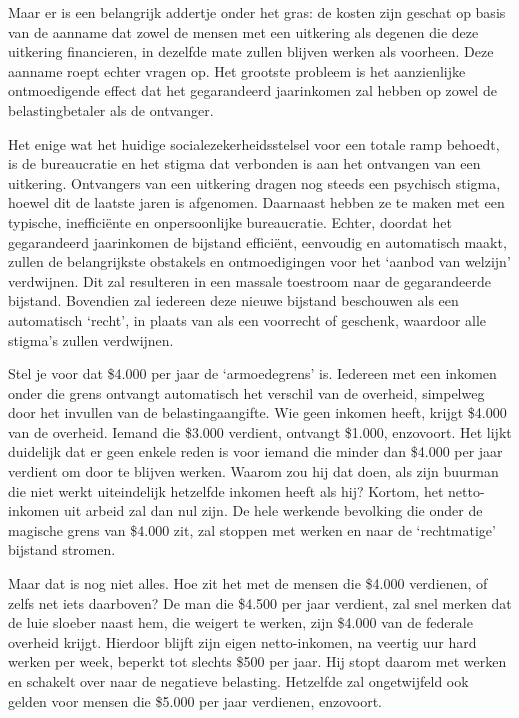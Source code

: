 \documentclass[
  a5paper,
  smalldemyvopaper,10pt,twoside,onecolumn,openright,extrafontsizes,hidelinks]{memoir}
\begin{document}
Maar er is een belangrijk addertje onder het gras: de kosten zijn
geschat op basis van de aanname dat zowel de mensen met een uitkering
als degenen die deze uitkering financieren, in dezelfde mate zullen
blijven werken als voorheen. Deze aanname roept echter vragen op. Het
grootste probleem is het aanzienlijke ontmoedigende effect dat het
gegarandeerd jaarinkomen zal hebben op zowel de belastingbetaler als de
ontvanger.

Het enige wat het huidige socialezekerheidsstelsel voor een totale ramp
behoedt, is de bureaucratie en het stigma dat verbonden is aan het
ontvangen van een uitkering. Ontvangers van een uitkering dragen nog
steeds een psychisch stigma, hoewel dit de laatste jaren is afgenomen.
Daarnaast hebben ze te maken met een typische, inefficiënte en
onpersoonlijke bureaucratie. Echter, doordat het gegarandeerd
jaarinkomen de bijstand efficiënt, eenvoudig en automatisch maakt,
zullen de belangrijkste obstakels en ontmoedigingen voor het `aanbod van
welzijn' verdwijnen. Dit zal resulteren in een massale toestroom naar de
gegarandeerde bijstand. Bovendien zal iedereen deze nieuwe bijstand
beschouwen als een automatisch `recht', in plaats van als een voorrecht
of geschenk, waardoor alle stigma's zullen verdwijnen.

Stel je voor dat \$4.000 per jaar de `armoedegrens' is. Iedereen met een
inkomen onder die grens ontvangt automatisch het verschil van de
overheid, simpelweg door het invullen van de belastingaangifte. Wie geen
inkomen heeft, krijgt \$4.000 van de overheid. Iemand die \$3.000
verdient, ontvangt \$1.000, enzovoort. Het lijkt duidelijk dat er geen
enkele reden is voor iemand die minder dan \$4.000 per jaar verdient om
door te blijven werken. Waarom zou hij dat doen, als zijn buurman die
niet werkt uiteindelijk hetzelfde inkomen heeft als hij? Kortom, het
netto-inkomen uit arbeid zal dan nul zijn. De hele werkende bevolking
die onder de magische grens van \$4.000 zit, zal stoppen met werken en
naar de `rechtmatige' bijstand stromen.

Maar dat is nog niet alles. Hoe zit het met de mensen die \$4.000
verdienen, of zelfs net iets daarboven? De man die \$4.500 per jaar
verdient, zal snel merken dat de luie sloeber naast hem, die weigert te
werken, zijn \$4.000 van de federale overheid krijgt. Hierdoor blijft
zijn eigen netto-inkomen, na veertig uur hard werken per week, beperkt
tot slechts \$500 per jaar. Hij stopt daarom met werken en schakelt over
naar de negatieve belasting. Hetzelfde zal ongetwijfeld ook gelden voor
mensen die \$5.000 per jaar verdienen, enzovoort.
\end{document}
